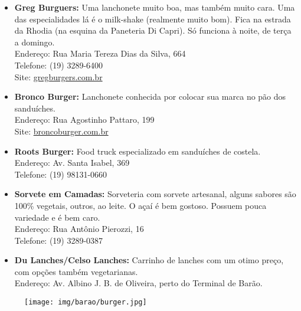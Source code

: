 \begin{itemize}
    \item   \textbf{Greg Burguers:} Uma lanchonete muito boa, mas também muito
        cara.  Uma das especialidades lá é o milk-shake (realmente muito bom).
        Fica na estrada da Rhodia (na esquina da Paneteria Di Capri). Só
        funciona à noite, de terça a domingo.
        \\Endereço: Rua Maria Tereza Dias da Silva, 664
        \\Telefone: (19) 3289-6400
        \\Site: \url{gregburgers.com.br}

    \item    \textbf{Bronco Burger:} Lanchonete conhecida por colocar sua marca
        no pão dos sanduíches.
        \\Endereço: Rua Agostinho Pattaro, 199
        \\Site: \url{broncoburger.com.br}

    \item    \textbf{Roots Burger:} Food truck especializado em sanduíches de
        costela.
        \\Endereço: Av. Santa Isabel, 369
        \\Telefone: (19) 98131-0660

    \item   \textbf{Sorvete em Camadas:}
        Sorveteria com sorvete artesanal, alguns sabores são 100\% vegetais,
        outros, ao leite. O açaí é bem gostoso. Possuem pouca variedade e é bem
        caro.
        \\Endereço: Rua Antônio Pierozzi, 16
        \\Telefone: (19) 3289-0387

    \item    \textbf{Du Lanches/Celso Lanches:} Carrinho de lanches com um otimo
        preço, com opções também vegetarianas.
        \\Endereço: Av. Albino J. B. de Oliveira, perto do Terminal de Barão.

\end{itemize}

\begin{figure}[h!]
    \centering
    \texttt{[image: img/barao/burger.jpg]}
\end{figure}

